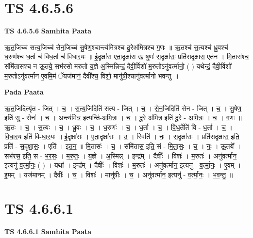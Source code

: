 \documentclass[17pt]{extarticle}
\begin{document}

\section{ TS 4.6.5.6 }

\textbf{TS 4.6.5.6 } \newline
\textbf{Samhita Paata} \newline

ऋ॒त॒जिच्च॑ सत्य॒जिच्च॑ सेन॒जिच्च॑ सु॒षेण॒श्चान्त्य॑मित्रश्च दू॒रेअ॑मित्रश्च ग॒णः ॥ ऋ॒तश्च॑ स॒त्यश्च॑ ध्रु॒वश्च॑ ध॒रुण॑श्च ध॒र्ता च॑ विध॒र्ता च॑ विधार॒यः ॥ ई॒दृक्षा॑स एता॒दृक्षा॑स ऊ॒ षुणः॑ स॒दृक्षा॑सः॒ प्रति॑सदृक्षास॒ एत॑न । मि॒तास॑श्च॒ संमि॑तासश्च न ऊ॒तये॒ सभ॑रसो मरुतो य॒ज्ञे अ॒स्मिन्निन्द्रं॒ दैवी॒र्विशो॑ म॒रुतोऽनु॑वर्त्मानो॒ ( ) यथेन्द्रं॒ दैवी॒र्विशो॑ म॒रुतोऽनु॑वर्त्मान ए॒वमि॒मं ॅयज॑मानं॒ दैवी᳚श्च॒ विशो॒ मानु॑षी॒श्चानु॑वर्त्मानो भवन्तु ॥ \newline

\textbf{Pada Paata} \newline

ऋ॒त॒जिदित्यृ॑त - जित् । च॒ । स॒त्य॒जिदिति॑ सत्य - जित् । च॒ । से॒न॒जिदिति॑ सेन - जित् । च॒ । सु॒षेण॒ इति॑ सु - सेनः॑ । च॒ । अन्त्य॑मित्र॒ इत्यन्ति॑-अ॒मि॒त्रः॒ । च॒ । दू॒रे अ॑मित्र॒ इति॑ दू॒रे - अ॒मि॒त्रः॒ । च॒ । ग॒णः ॥ ऋ॒तः । च॒ । स॒त्यः । च॒ । ध्रु॒वः । च॒ । ध॒रुणः॑ । च॒ । ध॒र्ता । च॒ । वि॒ध॒र्तेति॑ वि - ध॒र्ता । च॒ । वि॒धा॒र॒य इति॑ वि-धा॒र॒यः ॥ ई॒दृक्षा॑सः । ए॒ता॒दृक्षा॑सः । उ॒ । स्विति॑ । नः॒ । स॒दृक्षा॑सः । प्रति॑सदृक्षास॒ इति॒ प्रति॑ - स॒दृ॒क्षा॒सः॒ । एति॑ । इ॒त॒न॒ ॥ मि॒तासः॑ । च॒ । संमि॑तास॒ इति॒ सं - मि॒ता॒सः॒ । च॒ । नः॒ । ऊ॒तये᳚ । सभ॑रस॒ इति॒ स - भ॒र॒सः॒ । म॒रु॒तः॒ । य॒ज्ञे । अ॒स्मिन्न् । इन्द्र᳚म् । दैवीः᳚ । विशः॑ । म॒रुतः॑ । अनु॑वर्त्मान॒ इत्यनु॑-व॒र्त्मा॒नः॒ ( ) । यथा᳚ । इन्द्र᳚म् । दैवीः᳚ । विशः॑ । म॒रुतः॑ । अनु॑वर्त्मान॒ इत्यनु॑ - व॒र्त्मा॒नः॒ । ए॒वम् । इ॒मम् । यज॑मानम् । दैवीः᳚ । च॒ । विशः॑ । मानु॑षीः । च॒ । अनु॑वर्त्मान॒ इत्यनु॑ - व॒र्त्मा॒नः॒ । भ॒व॒न्तु॒ ॥  \newline





\section{ TS 4.6.6.1 }

\textbf{TS 4.6.6.1 } \newline
\textbf{Samhita Paata} \newline
\end{document}
